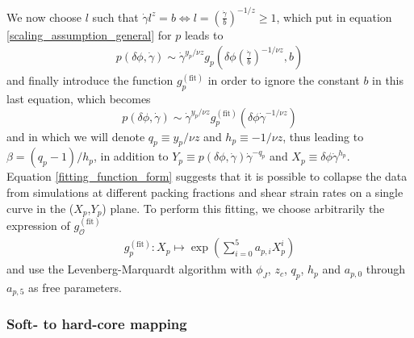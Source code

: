 \documentclass[class=article, float=false, crop=false]{standalone}
\begin{document}
We now choose $l$ such that $\dot{\gamma}l^z = b \Leftrightarrow l = \left(\frac{\dot{\gamma}}{b}\right)^{-1/z} \ge 1$, which put in equation \ref{scaling_assumption_general} for $p$ leads to
\begin{align*}
p(\delta\phi,\dot{\gamma}) \sim \dot{\gamma}^{y_p/\nu z} g_p\left(\delta\phi \left(\frac{\dot{\gamma}}{b}\right)^{-1/\nu z},b\right)
\end{align*}
and finally introduce the function $g_p^{(\text{fit})}$ in order to ignore the constant $b$ in this last equation, which becomes
\begin{equation}
p(\delta\phi,\dot{\gamma}) \sim \dot{\gamma}^{y_p/\nu z} g_p^{(\text{fit})}(\delta\phi\dot{\gamma}^{-1/\nu z})
\label{fitting_function_form}
\end{equation}
and in which we will denote $q_p\equiv y_p/\nu z$ and $h_p\equiv -1/\nu z$, thus leading to $\beta=(q_p-1)/h_p$, in addition to $Y_p \equiv p(\delta\phi,\dot{\gamma})\dot{\gamma}^{-q_p}$ and $X_p \equiv \delta\phi\dot{\gamma}^{h_p}$.\\


Equation \ref{fitting_function_form} suggests that it is possible to collapse the data from simulations at different packing fractions and shear strain rates on a single curve in the ($X_{p}$,$Y_{p}$) plane. To perform this fitting, we choose arbitrarily the expression of $g_{\mathcal{O}}^{(\text{fit})}$
\begin{align*}
g_{p}^{(\text{fit})}:X_{p}\mapsto\exp\left(\sum_{i=0}^5a_{p,i}X_{p}^i\right)
\end{align*}
and use the Levenberg-Marquardt algorithm \cite{marquardt1963algorithm,press2015numerical} with $\phi_J$, $z_c$, $q_{p}$, $h_{p}$ and $a_{p,0}$ through $a_{p,5}$ as free parameters.%

\subsubsection{Soft- to hard-core mapping}
\end{document}
